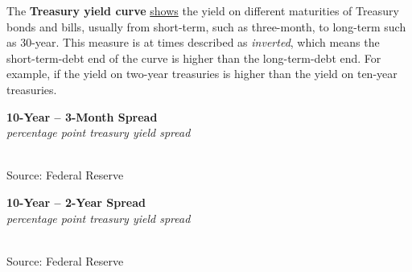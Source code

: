 \documentclass{report}
\makeatletter
\newcommand{\tbllink}[1]{\href{https://raw.githubusercontent.com/bdecon/US-chartbook/master/chartbook/data/#1}{\faTable}}
\newcommand*\short[1]{\expandafter\@gobbletwo\number\numexpr#1\relax}
\newcommand{\dateaxisticks}{
		date coordinates in=x, axis line style={draw=none},
		xmax={2020-08-10},
		max space between ticks=40,	    
		xtick={{1990-01-01}, {1992-01-01}, {1994-01-01}, 
			{1996-01-01}, {1998-01-01}, {2000-01-01}, 
			{2002-01-01}, {2004-01-01}, {2006-01-01},
			{2008-01-01}, {2010-01-01}, {2012-01-01}, {2014-01-01},
		    {2016-01-01}, {2018-01-01}, {2020-01-01}},
		minor xtick={{1989-01-01}, {1991-01-01}, {1993-01-01},
			{1995-01-01}, {1997-01-01}, {1999-01-01}, 
			{2001-01-01}, {2003-01-01}, {2005-01-01}, {2007-01-01},
		    {2009-01-01}, {2011-01-01}, {2013-01-01}, {2015-01-01},
		    {2017-01-01}, {2019-01-01}},
		enlarge y limits={0.06}, enlarge x limits={0.01},
		}
\newcommand{\bbar}[2]{extra #1 ticks = {{#2}}, extra #1 tick labels = ,
		extra #1 tick style = {grid=major, grid style={thick, black!25}},}
\newcommand{\thinline}[4]{\addplot[no markers, color=#1] 
		table [x=#2, y=#3, col sep=comma] {#4};	}
\makeatother
\begin{document}
{{{{{{{{{\newpage

\begin{minipage}{0.76\textwidth}

\small The \textbf{Treasury yield curve} \href{https://www.treasury.gov/resource-center/data-chart-center/interest-rates/Pages/TextView.aspx?data=yield}{shows} the yield on different maturities of Treasury bonds and bills, usually from short-term, such as three-month, to long-term such as 30-year. This measure is at times described as \textit{inverted}, which means the short-term-debt end of the curve is higher than the long-term-debt end. For example, if the yield on two-year treasuries is higher than the yield on ten-year treasuries. \\




\end{minipage}

\vspace{3mm}


\begin{minipage}{0.39\textwidth}

\noindent \normalsize \textbf{10-Year -- 3-Month Spread}\\
\footnotesize{\textit{percentage point treasury yield spread}}\\
\noindent \hspace*{-2mm} \\
\footnotesize{Source: Federal Reserve} \hspace{20mm} \tbllink{spread.csv} 
\end{minipage}
\hspace{2mm}
\begin{minipage}{0.39\textwidth}
\noindent \normalsize \textbf{10-Year -- 2-Year Spread}\\
\footnotesize{\textit{percentage point treasury yield spread}}\\
\noindent \hspace*{-2mm} \\
\footnotesize{Source: Federal Reserve} \hspace{20mm} \tbllink{spread.csv} 
\end{minipage}

}}}}}}}}}
\end{document}
